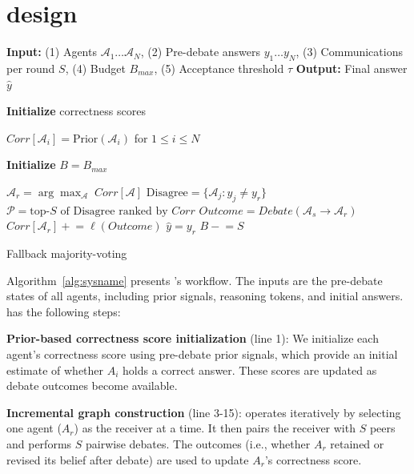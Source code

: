 \section{\sysname design}

\begin{algorithm}
\caption{\label{alg:sysname}\sysname}
\begin{algorithmic}[1]
\Statex \textbf{Input:} (1) Agents $\mathcal{A}_{1}\dots\mathcal{A}_{N}$, (2) Pre-debate answers $y_1\dots y_N$, (3) Communications per round $S$, (4) Budget $B_{max}$, (5) Acceptance threshold $\tau$
\Statex \textbf{Output:} Final answer $\hat{y}$

\State \textbf{Initialize} correctness scores

    $Corr[\mathcal{A}_i]=\text{Prior}(\mathcal{A}_i)$ for $1 \leq i \leq N$

\State \textbf{Initialize} $B=B_{max}$

    \State $\mathcal{A}_{r} = \arg\max_{\mathcal{A}} \; Corr[\mathcal{A}]$
    \State $\text{Disagree} = \{\mathcal{A}_j : y_j \neq y_{r}\}$
    \State $\mathcal{P} = \text{top-}S \text{ of } \text{Disagree} \text{ ranked by } Corr$
        \State $Outcome = Debate(\mathcal{A}_s \rightarrow \mathcal{A}_{r})$
        \State $Corr[\mathcal{A}_{r}] \mathrel{+}= \ell(Outcome)$
    \EndFor
        \State \Return $\hat{y} = y_{r}$
    \EndIf
    \State $B \mathrel{-}= S$
\EndWhile

\State \Return Fallback majority-voting
\end{algorithmic}
\end{algorithm}

Algorithm~\ref{alg:sysname} presents \sysname's workflow. The inputs are the pre-debate states of all agents, including prior signals, reasoning tokens, and initial answers. \sysname has the following steps:

\noindent\textbf{Prior-based correctness score initialization} (line 1): We initialize each agent's correctness score using pre-debate prior signals, which provide an initial estimate of whether $A_i$ holds a correct answer. These scores are updated as debate outcomes become available.

\noindent\textbf{Incremental graph construction} (line 3-15): \sysname operates iteratively by selecting one agent ($A_{r}$) as the receiver at a time. It then pairs the receiver with $S$ peers and performs $S$ pairwise debates. The outcomes (i.e., whether $A_{r}$ retained or revised its belief after debate) are used to update $A_{r}$'s correctness score.

